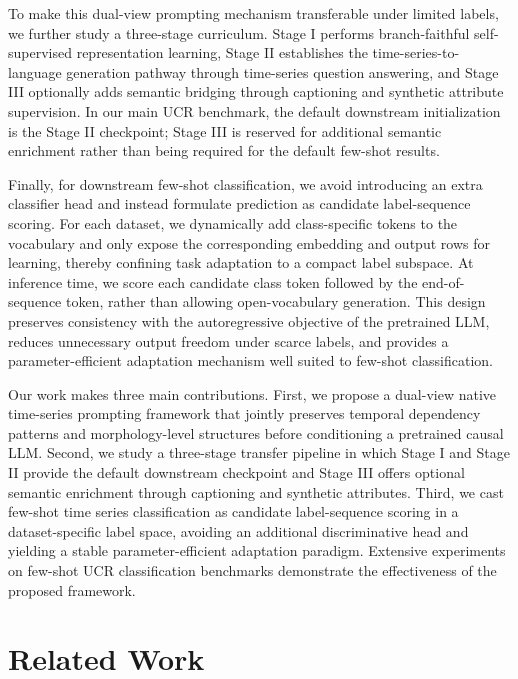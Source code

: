 \documentclass{article}
\begin{document}
    To make this dual-view prompting mechanism transferable under limited labels, we further study a three-stage curriculum. Stage I performs branch-faithful self-supervised representation learning, Stage II establishes the time-series-to-language generation pathway through time-series question answering, and Stage III optionally adds semantic bridging through captioning and synthetic attribute supervision. In our main UCR benchmark, the default downstream initialization is the Stage II checkpoint; Stage III is reserved for additional semantic enrichment rather than being required for the default few-shot results.
    
    Finally, for downstream few-shot classification, we avoid introducing an extra classifier head and instead formulate prediction as candidate label-sequence scoring. For each dataset, we dynamically add class-specific tokens to the vocabulary and only expose the corresponding embedding and output rows for learning, thereby confining task adaptation to a compact label subspace. At inference time, we score each candidate class token followed by the end-of-sequence token, rather than allowing open-vocabulary generation. This design preserves consistency with the autoregressive objective of the pretrained LLM, reduces unnecessary output freedom under scarce labels, and provides a parameter-efficient adaptation mechanism well suited to few-shot classification.
    
    Our work makes three main contributions. First, we propose a dual-view native time-series prompting framework that jointly preserves temporal dependency patterns and morphology-level structures before conditioning a pretrained causal LLM. Second, we study a three-stage transfer pipeline in which Stage I and Stage II provide the default downstream checkpoint and Stage III offers optional semantic enrichment through captioning and synthetic attributes. Third, we cast few-shot time series classification as candidate label-sequence scoring in a dataset-specific label space, avoiding an additional discriminative head and yielding a stable parameter-efficient adaptation paradigm. Extensive experiments on few-shot UCR classification benchmarks demonstrate the effectiveness of the proposed framework.

\section{Related Work}
\end{document}
